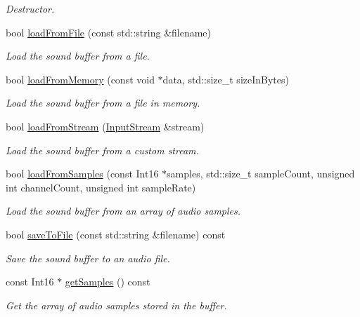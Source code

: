 \begin{DoxyCompactItemize}
\begin{DoxyCompactList}\small\item\em Destructor. \end{DoxyCompactList}\item 
bool \hyperlink{classsf_1_1_sound_buffer_a2be6a8025c97eb622a7dff6cf2594394}{load\+From\+File} (const std\+::string \&filename)
\begin{DoxyCompactList}\small\item\em Load the sound buffer from a file. \end{DoxyCompactList}\item 
bool \hyperlink{classsf_1_1_sound_buffer_af8cfa5599739a7edae69c5cba273d33f}{load\+From\+Memory} (const void $\ast$data, std\+::size\+\_\+t size\+In\+Bytes)
\begin{DoxyCompactList}\small\item\em Load the sound buffer from a file in memory. \end{DoxyCompactList}\item 
bool \hyperlink{classsf_1_1_sound_buffer_ad292156b1e01f6dabd4c0c277d5e079e}{load\+From\+Stream} (\hyperlink{classsf_1_1_input_stream}{Input\+Stream} \&stream)
\begin{DoxyCompactList}\small\item\em Load the sound buffer from a custom stream. \end{DoxyCompactList}\item 
bool \hyperlink{classsf_1_1_sound_buffer_a63da986e144b578135edd48e51c565e8}{load\+From\+Samples} (const Int16 $\ast$samples, std\+::size\+\_\+t sample\+Count, unsigned int channel\+Count, unsigned int sample\+Rate)
\begin{DoxyCompactList}\small\item\em Load the sound buffer from an array of audio samples. \end{DoxyCompactList}\item 
bool \hyperlink{classsf_1_1_sound_buffer_ab2083dc1a934c64959d9e3f162328a76}{save\+To\+File} (const std\+::string \&filename) const 
\begin{DoxyCompactList}\small\item\em Save the sound buffer to an audio file. \end{DoxyCompactList}\item 
const Int16 $\ast$ \hyperlink{classsf_1_1_sound_buffer_a4ba0c1e5b5be500af42de30b1360eb2e}{get\+Samples} () const 
\begin{DoxyCompactList}\small\item\em Get the array of audio samples stored in the buffer. \end{DoxyCompactList}\item 

\end{DoxyCompactItemize}
